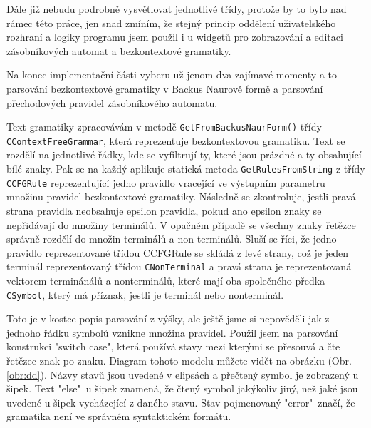 Dále již nebudu podrobně vysvětlovat jednotlivé třídy, protože by to bylo nad rámec této práce, jen snad zmíním, že stejný princip oddělení uživatelského rozhraní a logiky programu jsem použil i u widgetů pro zobrazování a editaci zásobníkových automat a bezkontextové gramatiky.

Na konec implementační části vyberu už jenom dva zajímavé momenty a to parsování bezkontextové gramatiky v Backus Naurově formě a parsování přechodových pravidel zásobníkového automatu.



Text gramatiky zpracovávám v metodě \texttt{GetFromBackusNaurForm()} třídy \texttt{CContextFreeGrammar}, která reprezentuje bezkontextovou gramatiku. Text se rozdělí na jednotlivé řádky, kde se vyfiltrují ty, které jsou prázdné a ty obsahující bílé znaky. Pak se na každý aplikuje statická metoda \texttt{GetRulesFromString} z třídy \texttt{CCFGRule} reprezentující jedno pravidlo vracející ve výstupním parametru množinu pravidel bezkontextové gramatiky. Následně se zkontroluje, jestli pravá strana pravidla neobsahuje epsilon pravidla, pokud ano epsilon znaky se nepřidávají do množiny terminálů. V opačném případě se všechny znaky řetězce správně rozdělí do množin terminálů a non-terminálů. Sluší se říci, že jedno pravidlo reprezentované třídou CCFGRule se skládá z levé strany, což je jeden terminál reprezentovaný třídou \texttt{CNonTerminal} a pravá strana je reprezentovaná vektorem terminánálů a nonterminálů, které mají oba společného předka \texttt{CSymbol}, který má příznak, jestli je terminál nebo nonterminál. 

Toto je v kostce popis parsování z výšky, ale ještě jsme si nepověděli jak z jednoho řádku symbolů vznikne množina pravidel. Použil jsem na parsování konstrukci "switch case", která používá stavy mezi kterými se přesouvá a čte řetězec znak po znaku. Diagram tohoto modelu můžete vidět na obrázku (Obr. \ref{obr:dd}). Názvy stavů jsou uvedené v elipsách a přečtený symbol je zobrazený u šipek. Text "else"\ u šipek znamená, že čtený symbol jakýkoliv jiný, než jaké jsou uvedené u šipek vycházející z daného stavu. Stav pojmenovaný "error"\ značí, že gramatika není ve správném syntaktickém formátu. 


